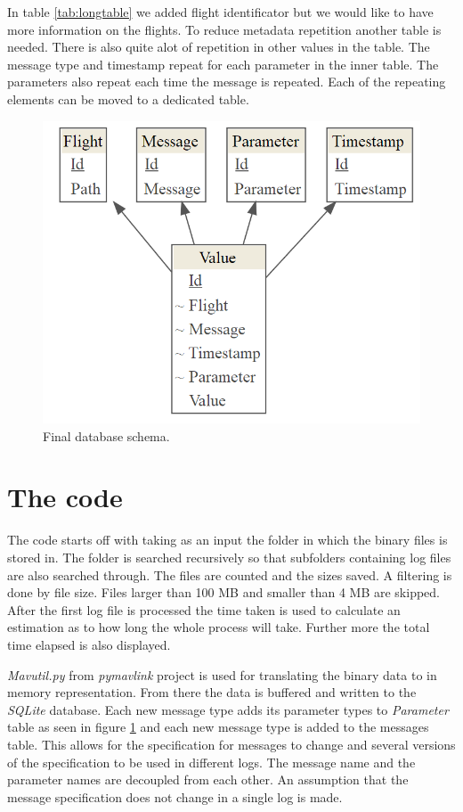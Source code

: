 \documentclass[12pt,oneside]{reedthesis}
\theoremstyle{definition}
\theoremstyle{definition}
\theoremstyle{definition}
\theoremstyle{remark}
\begin{document}
In table \ref{tab:longtable} we added flight identificator but we would
like to have more information on the flights. To reduce metadata
repetition another table is needed. There is also quite alot of
repetition in other values in the table. The message type and timestamp
repeat for each parameter in the inner table. The parameters also repeat
each time the message is repeated. Each of the repeating elements can be
moved to a dedicated table.
\begin{figure}
\centering
\includegraphics{./figure/databaseSchema.PNG}
\caption{\label{fig:database}Final database schema.}
\end{figure}
\section{The code}\label{the-code}

The code starts off with taking as an input the folder in which the
binary files is stored in. The folder is searched recursively so that
subfolders containing log files are also searched through. The files are
counted and the sizes saved. A filtering is done by file size. Files
larger than 100 MB and smaller than 4 MB are skipped. After the first
log file is processed the time taken is used to calculate an estimation
as to how long the whole process will take. Further more the total time
elapsed is also displayed.

\emph{Mavutil.py} from \emph{pymavlink} project is used for translating
the binary data to in memory representation. From there the data is
buffered and written to the \emph{SQLite} database. Each new message
type adds its parameter types to \emph{Parameter} table as seen in
figure \ref{fig:database} and each new message type is added to the
messages table. This allows for the specification for messages to change
and several versions of the specification to be used in different logs.
The message name and the parameter names are decoupled from each other.
An assumption that the message specification does not change in a single
log is made.
\end{document}
